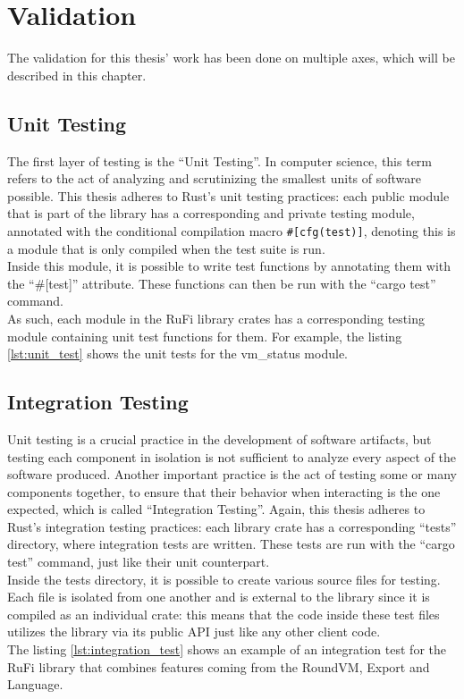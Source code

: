 
\chapter{Validation}
\label{chap:validation}

The validation for this thesis' work has been done on multiple axes, which will be described in this chapter.

\section{Unit Testing}
The first layer of testing is the ``Unit Testing''. In computer science, this term refers to the act of analyzing and scrutinizing the smallest units of software possible.
This thesis adheres to Rust's unit testing practices: each public module that is part of the library has a corresponding and private testing module, annotated with the
conditional compilation macro \texttt{\#[cfg(test)]}, denoting this is a module that is only compiled when the test suite is run.\\
Inside this module, it is possible to write test functions by annotating them with the ``\#[test]'' attribute. These functions can then be run with the ``cargo test'' command.\\
As such, each module in the RuFi library crates has a corresponding testing module containing unit test functions for them. For example, the listing \ref{lst:unit_test} shows the unit tests for the
vm\_status module.



\section{Integration Testing}
Unit testing is a crucial practice in the development of software artifacts, but testing each component in isolation is not sufficient to analyze every aspect of the software produced.
Another important practice is the act of testing some or many components together, to ensure that their behavior when interacting is the one expected, which is called ``Integration Testing''.
Again, this thesis adheres to Rust's integration testing practices: each library crate has a corresponding ``tests'' directory, where integration tests are written. These tests are run with the ``cargo test'' command, just like their unit counterpart.\\
Inside the tests directory, it is possible to create various source files for testing. Each file is isolated from one another and is external to the library since it is compiled as an individual crate: this means that the
code inside these test files utilizes the library via its public API just like any other client code.\\
The listing \ref{lst:integration_test} shows an example of an integration test for the RuFi library that combines features coming from the RoundVM, Export and Language.

